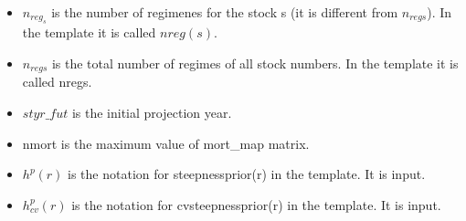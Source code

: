 \documentclass{article}
\begin{document}
\begin{itemize}
    \item $n_{reg_s}$ is the number of regimenes for the stock s (it is different from $n_{regs}$). In the template it is called $nreg(s)$.
    

    \item $n_{regs}$ is the total number of regimes of all stock numbers. In the template it is called 
    nregs.
    \item $styr\_fut$ is the initial projection year.
    
    
    \item nmort is the maximum value of mort\_map matrix. 
    \item $h^p(r)$ is the notation for steepnessprior(r) in the template. It is input.
    \item $h^p_{cv}(r)$ is the notation for cvsteepnessprior(r) in the template. It is input.


\end{itemize}
\end{document}
